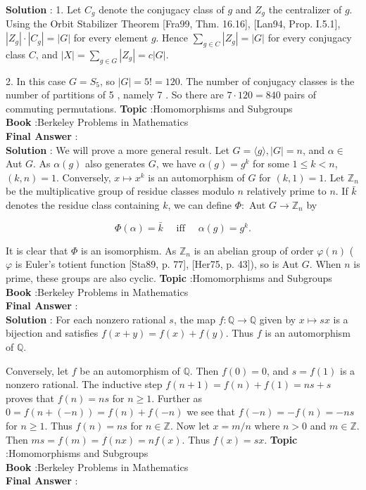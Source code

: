 \documentclass[10pt]{article}
\begin{document}
\textbf{Solution} : 1. Let $C_{g}$ denote the conjugacy class of $g$ and $Z_{g}$ the centralizer of $g$. Using the Orbit Stabilizer Theorem [Fra99, Thm. 16.16], [Lan94, Prop. I.5.1], $\left|Z_{g}\right| \cdot\left|C_{g}\right|=|G|$ for every element $g$. Hence $\sum_{g \in C}\left|Z_{g}\right|=|G|$ for every conjugacy class $C$, and $|X|=\sum_{g \in G}\left|Z_{g}\right|=c|G|$.

2. In this case $G=S_{5}$, so $|G|=5 !=120$. The number of conjugacy classes is the number of partitions of 5 , namely 7 . So there are $7 \cdot 120=840$ pairs of commuting permutations.
\textbf{Topic} :Homomorphisms and Subgroups \\
\textbf{Book} :Berkeley Problems in Mathematics\\
\textbf{Final Answer} :\\


\textbf{Solution} : We will prove a more general result. Let $G=\langle g\rangle,|G|=n$, and $\alpha \in$ Aut $G$. As $\alpha(g)$ also generates $G$, we have $\alpha(g)=g^{k}$ for some $1 \leqslant k<n$, $(k, n)=1$. Conversely, $x \mapsto x^{k}$ is an automorphism of $G$ for $(k, 1)=1$. Let $\mathbb{Z}_{n}$ be the multiplicative group of residue classes modulo $n$ relatively prime to $n$. If $\bar{k}$ denotes the residue class containing $k$, we can define $\Phi:$ Aut $G \rightarrow \mathbb{Z}_{n}$ by

$$
\Phi(\alpha)=\bar{k} \quad \text { iff } \quad \alpha(g)=g^{k} .
$$

It is clear that $\Phi$ is an isomorphism. As $\mathbb{Z}_{n}$ is an abelian group of order $\varphi(n)$ ( $\varphi$ is Euler's totient function [Sta89, p. 77], [Her75, p. 43]), so is Aut $G$. When $n$ is prime, these groups are also cyclic.
\textbf{Topic} :Homomorphisms and Subgroups \\
\textbf{Book} :Berkeley Problems in Mathematics\\
\textbf{Final Answer} :\\


\textbf{Solution} : For each nonzero rational $s$, the map $f: \mathbb{Q} \rightarrow \mathbb{Q}$ given by $x \mapsto s x$ is a bijection and satisfies $f(x+y)=f(x)+f(y)$. Thus $f$ is an automorphism of $\mathbb{Q}$.

Conversely, let $f$ be an automorphism of $\mathbb{Q}$. Then $f(0)=0$, and $s=f(1)$ is a nonzero rational. The inductive step $f(n+1)=f(n)+f(1)=n s+s$ proves that $f(n)=n s$ for $n \geqslant 1$. Further as $0=f(n+(-n))=f(n)+f(-n)$ we see that $f(-n)=-f(n)=-n s$ for $n \geqslant 1$. Thus $f(n)=n s$ for $n \in \mathbb{Z}$. Now let $x=m / n$ where $n>0$ and $m \in \mathbb{Z}$. Then $m s=f(m)=f(n x)=n f(x)$. Thus $f(x)=s x$.
\textbf{Topic} :Homomorphisms and Subgroups \\
\textbf{Book} :Berkeley Problems in Mathematics\\
\textbf{Final Answer} :\\
\end{document}
